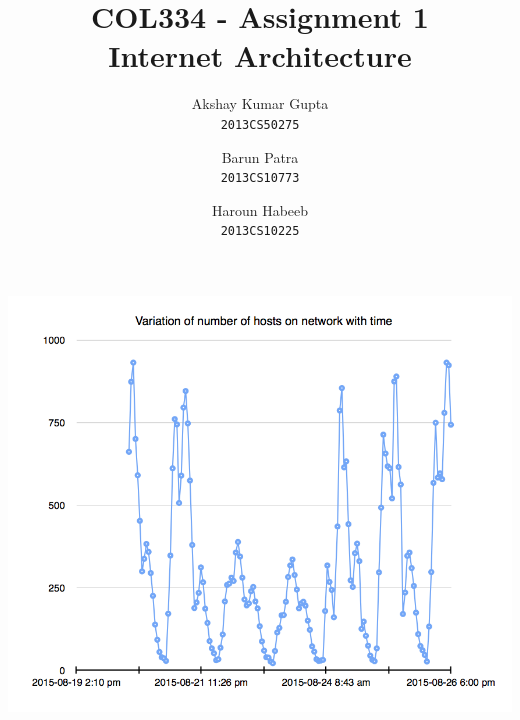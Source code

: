 \documentclass[]{article}
\begin{document}
\title{COL334 - Assignment 1\\ Internet Architecture}
\author{Akshay Kumar Gupta\\\texttt{2013CS50275} \and  Barun Patra\\\texttt{2013CS10773} \and Haroun Habeeb\\\texttt{2013CS10225}}
\date{}
\maketitle
{\centering
{\includegraphics[scale=0.4]{../src/2aResults.png}
}
\\
}
\end{document}
